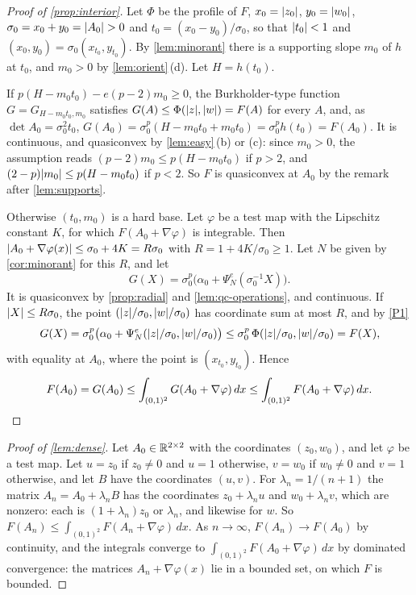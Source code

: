 \begin{proof}[Proof of \cref{prop:interior}]
Let $\Phi$ be the profile of $F$, $x_0=\lvert z_0\rvert$, $y_0=\lvert w_0\rvert$, $\sigma_0=x_0+y_0=\lvert A_0\rvert>0$
and $t_0=(x_0-y_0)/\sigma_0$, so that $\lvert t_0\rvert<1$ and $(x_0,y_0)=\sigma_0(x_{t_0},y_{t_0})$.
By \cref{lem:minorant} there is a supporting slope $m_0$ of $h$ at $t_0$, and $m_0>0$ by
\cref{lem:orient}\,(d). Let $H=h(t_0)$.

If $p(H-m_0t_0)-e(p-2)m_0\ge0$, the Burkholder-type function $G=G_{H-m_0t_0,m_0}$ satisfies
$G(A)\le\Phi(\lvert z\rvert,\lvert w\rvert)=F(A)$ for every $A$, and, as $\det A_0=\sigma_0^2t_0$,
$G(A_0)=\sigma_0^p(H-m_0t_0+m_0t_0)=\sigma_0^ph(t_0)=F(A_0)$. It is continuous, and
quasiconvex by \cref{lem:easy}\,(b) or (c): since $m_0>0$, the assumption reads
$(p-2)m_0\le p(H-m_0t_0)$ if $p>2$, and $(2-p)\lvert m_0\rvert\le p(H-m_0t_0)$ if $p<2$. So $F$ is
quasiconvex at $A_0$ by the remark after \cref{lem:supports}.

Otherwise $(t_0,m_0)$ is a hard base. Let $\varphi$ be a test map with the Lipschitz constant
$K$, for which $F(A_0+\nabla\varphi)$ is integrable. Then
$\lvert A_0+\nabla\varphi(x)\rvert\le\sigma_0+4K=R\sigma_0$ with $R=1+4K/\sigma_0\ge1$. Let $N$ be given
by \cref{cor:minorant} for this $R$, and let
\[
  G(X)=\sigma_0^p\bigl(\alpha_0+\Psi^e_N(\sigma_0^{-1}X)\bigr).
\]
It is quasiconvex by \cref{prop:radial} and \cref{lem:qc-operations}, and continuous. If
$\lvert X\rvert\le R\sigma_0$, the point $(\lvert z\rvert/\sigma_0,\lvert w\rvert/\sigma_0)$ has coordinate sum at
most $R$, and by \ref{P1}
\[
  G(X)=\sigma_0^p\bigl(\alpha_0+\Psi^e_N(\lvert z\rvert/\sigma_0,\lvert w\rvert/\sigma_0)\bigr)\le
  \sigma_0^p\,\Phi(\lvert z\rvert/\sigma_0,\lvert w\rvert/\sigma_0)=F(X),
\]
with equality at $A_0$, where the point is $(x_{t_0},y_{t_0})$. Hence
\[
  F(A_0)=G(A_0)\le\int_{(0,1)^2}G(A_0+\nabla\varphi)\,dx\le\int_{(0,1)^2}F(A_0+\nabla\varphi)\,dx.
  \qedhere
\]
\end{proof}

\begin{proof}[Proof of \cref{lem:dense}]
Let $A_0\in\mathbb{R}^{2\times 2}$ with the coordinates $(z_0,w_0)$, and let $\varphi$ be a test map. Let $u=z_0$ if
$z_0\ne0$ and $u=1$ otherwise, $v=w_0$ if $w_0\ne0$ and $v=1$ otherwise, and let $B$ have the
coordinates $(u,v)$. For $\lambda_n=1/(n+1)$ the matrix $A_n=A_0+\lambda_nB$ has the
coordinates $z_0+\lambda_nu$ and $w_0+\lambda_nv$, which are nonzero: each is
$(1+\lambda_n)z_0$ or $\lambda_n$, and likewise for $w$. So
$F(A_n)\le\int_{(0,1)^2}F(A_n+\nabla\varphi)\,dx$. As $n\to\infty$, $F(A_n)\to F(A_0)$ by
continuity, and the integrals converge to $\int_{(0,1)^2}F(A_0+\nabla\varphi)\,dx$ by dominated
convergence: the matrices $A_n+\nabla\varphi(x)$ lie in a bounded set, on which $F$ is
bounded.
\end{proof}

